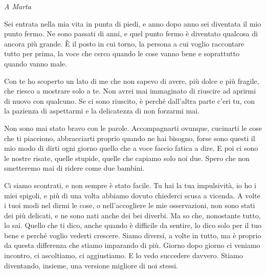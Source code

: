 \clearpage
\vspace{10mm}
\begin{center}
    \textit{A Marta}
\end{center}
\vspace{5mm}

Sei entrata nella mia vita in punta di piedi, e anno dopo anno sei diventata il mio punto fermo. Ne sono passati di anni, e quel punto fermo è diventato qualcosa di ancora più grande. È il posto in cui torno, la persona a cui voglio raccontare tutto per prima, la voce che cerco quando le cose vanno bene e soprattutto quando vanno male.\par

\vspace{5mm}

Con te ho scoperto un lato di me che non sapevo di avere, più dolce e più fragile, che riesco a mostrare solo a te. Non avrei mai immaginato di riuscire ad aprirmi di nuovo con qualcuno. Se ci sono riuscito, è perché dall'altra parte c'eri tu, con la pazienza di aspettarmi e la delicatezza di non forzarmi mai.\par

Non sono mai stato bravo con le parole. Accompagnarti ovunque, cucinarti le cose che ti piacciono, abbracciarti proprio quando ne hai bisogno, forse sono questi il mio modo di dirti ogni giorno quello che a voce faccio fatica a dire. E poi ci sono le nostre risate, quelle stupide, quelle che capiamo solo noi due. Spero che non smetteremo mai di ridere come due bambini.\par

\vspace{5mm}

Ci siamo scontrati, e non sempre è stato facile. Tu hai la tua impulsività, io ho i miei spigoli, e più di una volta abbiamo dovuto chiederci scusa a vicenda. A volte i tuoi modi nel dirmi le cose, o nell'accogliere le mie osservazioni, non sono stati dei più delicati, e ne sono nati anche dei bei diverbi. Ma so che, nonostante tutto, lo sai. Quello che ti dico, anche quando è difficile da sentire, lo dico solo per il tuo bene e perché voglio vederti crescere. Siamo diversi, a volte in tutto, ma è proprio da questa differenza che stiamo imparando di più. Giorno dopo giorno ci veniamo incontro, ci ascoltiamo, ci aggiustiamo. E lo vedo succedere davvero. Stiamo diventando, insieme, una versione migliore di noi stessi.\par

\vspace{5mm}


